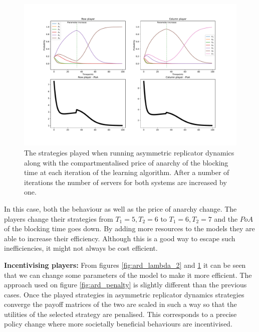 \begin{figure}[H]
    \includegraphics[width=\textwidth]{imgs/asymmetric_rd_and_PoA/asymmetric_increase_C.pdf}
    \caption{
        The strategies played when running asymmetric replicator dynamics
        along with the compartmentalised price of anarchy of the blocking time 
        at each iteration of the learning algorithm. After a number of 
        iterations the number of servers for both systems are increased by one.
    }
    \label{fig:ard_num_of_servers}
\end{figure}

In this case, both the behaviour as well as the price of anarchy change.
The players change their strategies from \(T_1 = 5, T_2 = 6\) to 
\(T_1 = 6, T_2 = 7\) and the \(PoA\) of the blocking time goes down.
By adding more resources to the models they are able to increase their 
efficiency.
Although this is a good way to escape such inefficiencies, it might not always
be cost efficient.

\textbf{Incentivising players:}
From figures \ref{fig:ard_lambda_2} and \ref{fig:ard_num_of_servers} it can be
seen that we can change some parameters of the model to make it more efficient.
The approach used on figure \ref{fig:ard_penalty} is slightly different than 
the previous cases.
Once the played strategies in asymmetric replicator dynamics strategies 
converge the payoff matrices of the two are scaled in such a way so that the 
utilities of the selected strategy are penalised. This corresponds to a precise
policy change where more societally beneficial behaviours are incentivised.

